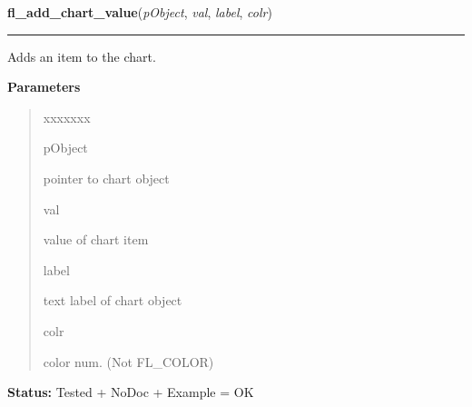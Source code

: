 \hspace{.8\funcindent}\begin{boxedminipage}{\funcwidth}

    \raggedright \textbf{fl\_add\_chart\_value}(\textit{pObject}, \textit{val}, \textit{label}, \textit{colr})

    \vspace{-1.5ex}

    \rule{\textwidth}{0.5\fboxrule}
\setlength{\parskip}{2ex}
    Adds an item to the chart.

\setlength{\parskip}{1ex}
      \textbf{Parameters}
      \vspace{-1ex}

      \begin{quote}
        \begin{Ventry}{xxxxxxx}

          \item[pObject]

          pointer to chart object

          \item[val]

          value of chart item

          \item[label]

          text label of chart object

          \item[colr]

          color num. (Not FL\_COLOR)

        \end{Ventry}

      \end{quote}

\textbf{Status:} Tested + NoDoc + Example = OK



    \end{boxedminipage}

    \label{xformslib:library:fl_insert_chart_value}

    \vspace{0.5ex}

